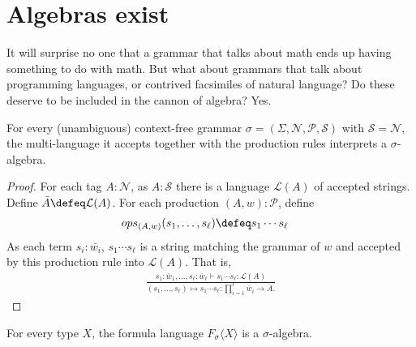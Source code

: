 \section{Algebras exist}

It will surprise no one that a grammar that talks about math ends up having 
something to do with math.  But what about grammars that talk about 
programming languages, or contrived facsimiles of natural language?
Do these deserve to be included in the cannon of algebra?  Yes.

\begin{theorem}
    For every (unambiguous) context-free grammar $\sigma=(\Sigma,\mathcal{N},\mathcal{P},\mathcal{S})$
    with $\mathcal{S}=\mathcal{N}$, the multi-language it 
    accepts together with the production rules interprets a $\sigma$-algebra.
\end{theorem}
\begin{proof}
    For each tag $A:\mathcal{N}$, as $A:\mathcal{S}$ there is a 
    language $\mathcal{L}(A)$ of accepted strings.  Define 
    $\bar{A}\defeq \mathcal{L}(A)$.
    For each production $(A,w):\mathcal{P}$, define  
    \begin{align*}
        ops_{(A,w)}(s_1,\ldots,s_{\ell}) & \defeq s_1\cdots s_{\ell}
    \end{align*}
    As each term $s_i:\bar{w_i}$, $s_1\cdots s_{\ell}$ is a string matching
    the grammar of $w$ and accepted by this production rule into $\mathcal{L}(A)$.
    That is, 
    \begin{align*}
        \frac{
            s_1:\bar{w}_1,\ldots,s_{\ell}:\bar{w}_{\ell}\vdash s_1\cdots s_{\ell}:\mathcal{L}(A)
        }{
            (s_1,\ldots, s_{\ell})\mapsto s_1\cdots s_{\ell}
            :\prod_{i=1}^{\ell}\bar{w}_i\to \bar{A}.
        }
    \end{align*}
\end{proof}

\begin{theorem}
    For every type $X$, the formula language $F_{\sigma}\langle X\rangle$ is a $\sigma$-algebra.
\end{theorem}


